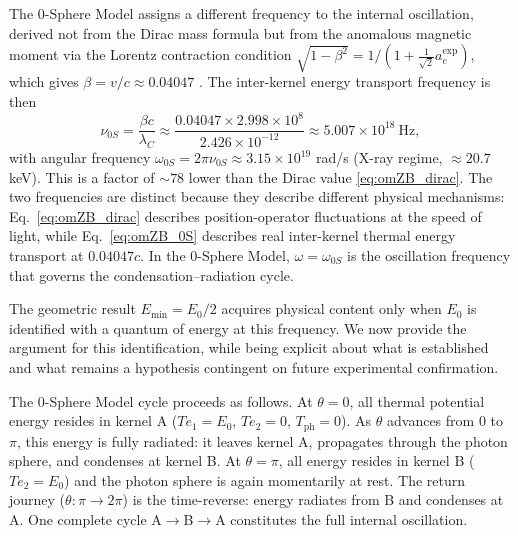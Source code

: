 \documentclass[%
 reprint, amsmath,amssymb, aps, prb, ]{revtex4-2}
\numberwithin{equation}{section}
\begin{document}
The 0-Sphere Model assigns a different frequency to the internal oscillation, derived not from the Dirac mass formula but from the anomalous magnetic moment via the Lorentz contraction condition $\sqrt{1-\beta^2} = 1/(1 + \tfrac{1}{\sqrt{2}}a_e^\text{exp})$, which gives $\beta = v/c \approx 0.04047$ \cite{hanamura_spin2024}. The inter-kernel energy transport frequency is then
\begin{equation}
\nu_{0S} = \frac{\beta c}{\lambda_C} \approx \frac{0.04047 \times 2.998\times10^{8}}{2.426\times10^{-12}} \approx 5.007\times10^{18}\ \text{Hz},
\label{eq:omZB_0S}
\end{equation}
with angular frequency $\omega_{0S} = 2\pi\nu_{0S} \approx 3.15\times10^{19}$ rad/s (X-ray regime, $\approx 20.7$ keV). This is a factor of $\sim 78$ lower than the Dirac value \eqref{eq:omZB_dirac}. The two frequencies are distinct because they describe different physical mechanisms: Eq.~\eqref{eq:omZB_dirac} describes position-operator fluctuations at the speed of light, while Eq.~\eqref{eq:omZB_0S} describes real inter-kernel thermal energy transport at $0.04047c$. In the 0-Sphere Model, $\omega = \omega_{0S}$ is the oscillation frequency that governs the condensation--radiation cycle.

The geometric result $E_\text{min} = E_0/2$ acquires physical content only when $E_0$ is identified with a quantum of energy at this frequency. We now provide the argument for this identification, while being explicit about what is established and what remains a hypothesis contingent on future experimental confirmation.

The 0-Sphere Model cycle proceeds as follows. At $\theta = 0$, all thermal potential energy resides in kernel A ($Te_1 = E_0$, $Te_2 = 0$, $T_\text{ph} = 0$). As $\theta$ advances from 0 to $\pi$, this energy is fully radiated: it leaves kernel A, propagates through the photon sphere, and condenses at kernel B. At $\theta = \pi$, all energy resides in kernel B ($Te_2 = E_0$) and the photon sphere is again momentarily at rest. The return journey ($\theta\colon \pi \to 2\pi$) is the time-reverse: energy radiates from B and condenses at A. One complete cycle A$\to$B$\to$A constitutes the full internal oscillation.
\end{document}
